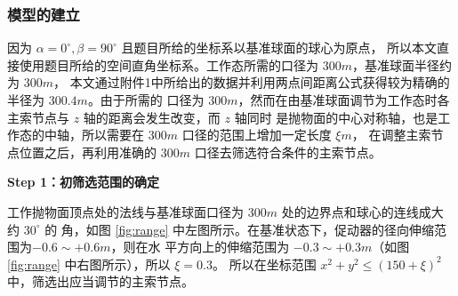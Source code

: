 \documentclass[withoutpreface,bwprint]{cumcmthesis} %
\begin{document}
\subsubsection{模型的建立}
因为 $\alpha = 0^\circ ,\beta = 90^\circ$ 且题目所给的坐标系以基准球面的球心为原点，
所以本文直接使用题目所给的空间直角坐标系。工作态所需的口径为 $300m$，基准球面半径约为 $300m$，
本文通过附件1中所给出的数据并利用两点间距离公式获得较为精确的半径为 $300.4m$。由于所需的
口径为 $300m$，然而在由基准球面调节为工作态时各主索节点与 $z$ 轴的距离会发生改变，而 $z$ 轴同时
是抛物面的中心对称轴，也是工作态的中轴，所以需要在 $300m$ 口径的范围上增加一定长度 $\xi m$，
在调整主索节点位置之后，再利用准确的 $300m$ 口径去筛选符合条件的主索节点。

\textbf{Step 1：初筛选范围的确定}

工作抛物面顶点处的法线与基准球面口径为 $300m$ 处的边界点和球心的连线成大约 $30^\circ$ 的
角，如图 \ref{fig:range} 中左图所示。在基准状态下，促动器的径向伸缩范围为$-0.6\sim +0.6m$，则在水
平方向上的伸缩范围为 $-0.3\sim +0.3m$（如图 \ref{fig:range} 中右图所示），所以 $\xi = 0.3$。
所以在坐标范围 $x^2 + y^2 \leqslant (150 + \xi)^2$ 中，筛选出应当调节的主索节点。
\end{document}
